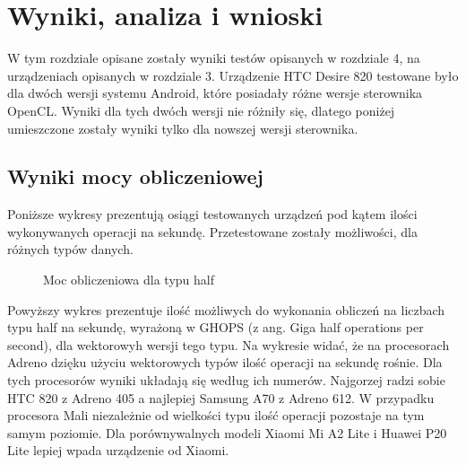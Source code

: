 \section[Wyniki, analiza i wnioski]{Wyniki, analiza i wnioski}
W tym rozdziale opisane zostały wyniki testów opisanych w rozdziale 4, na urządzeniach opisanych w rozdziale 3. Urządzenie HTC Desire 820 testowane było dla dwóch wersji systemu Android, które posiadały różne wersje sterownika OpenCL. Wyniki dla tych dwóch wersji nie różniły się, dlatego poniżej umieszczone zostały wyniki tylko dla nowszej wersji sterownika.
\subsection[Wyniki mocy obliczeniowej]{Wyniki mocy obliczeniowej}
Poniższe wykresy prezentują osiągi testowanych urządzeń pod kątem ilości wykonywanych operacji na sekundę. Przetestowane zostały możliwości, dla różnych typów danych.
\begin{figure}[H]
\caption{Moc obliczeniowa dla typu half}
\end{figure}
Powyższy wykres prezentuje ilość możliwych do wykonania obliczeń na liczbach typu half na sekundę, wyrażoną w GHOPS (z ang. Giga half operations per second), dla wektorowyh wersji tego typu. Na wykresie widać, że na procesorach Adreno dzięku użyciu wektorowych typów ilość operacji na sekundę rośnie. Dla tych procesorów wyniki układają się według ich numerów. Najgorzej radzi sobie HTC 820 z Adreno 405 a najlepiej Samsung A70 z Adreno 612. W przypadku procesora Mali niezależnie od wielkości typu ilość operacji pozostaje na tym samym poziomie. Dla porównywalnych modeli Xiaomi Mi A2 Lite i Huawei P20 Lite lepiej wpada urządzenie od Xiaomi.

